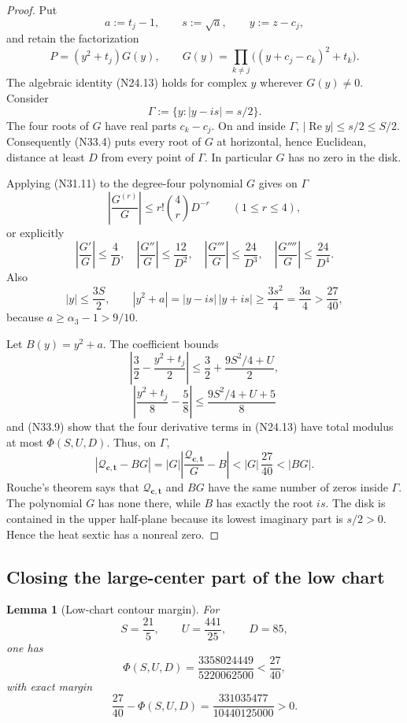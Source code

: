 \documentclass[11pt]{article}
\newtheorem{lemma}[theorem]{Lemma}
\theoremstyle{definition}
\theoremstyle{remark}
\begin{document}
\begin{proof}
Put
\[
 a:=t_j-1,\qquad s:=\sqrt a,\qquad y:=z-c_j,
 \tag{N33.5}
\]
and retain the factorization
\[
 P=(y^2+t_j)G(y),\qquad
 G(y)=\prod_{k\ne j}\bigl((y+c_j-c_k)^2+t_k\bigr).
 \tag{N33.6}
\]
The algebraic identity \textup{(N24.13)} holds for complex \(y\)
wherever \(G(y)\ne0\).  Consider
\[
 \Gamma:=\{y:|y-is|=s/2\}.
 \tag{N33.7}
\]
The four roots of \(G\) have real parts \(c_k-c_j\).  On and inside
\(\Gamma\), \(|\operatorname{Re}y|\leq s/2\leq S/2\).
Consequently \textup{(N33.4)} puts every root of \(G\) at horizontal,
hence Euclidean, distance at least \(D\) from every point of \(\Gamma\).
In particular \(G\) has no zero in the disk.

Applying \textup{(N31.11)} to the degree-four polynomial \(G\) gives
on \(\Gamma\)
\[
 \left|\frac{G^{(r)}}G\right|
 \leq r!\binom4rD^{-r}\qquad(1\leq r\leq4),
 \tag{N33.8}
\]
or explicitly
\[
 \left|\frac{G'}G\right|\leq\frac4D,\quad
 \left|\frac{G''}G\right|\leq\frac{12}{D^2},\quad
 \left|\frac{G'''}G\right|\leq\frac{24}{D^3},\quad
 \left|\frac{G''''}G\right|\leq\frac{24}{D^4}.
 \tag{N33.9}
\]
Also
\[
 |y|\leq\frac{3S}{2},\qquad
 |y^2+a|=|y-is|\,|y+is|
 \geq\frac{3s^2}{4}
 =\frac{3a}{4}>\frac{27}{40},
 \tag{N33.10}
\]
because \(a\geq\alpha_3-1>9/10\).

Let \(B(y)=y^2+a\).  The coefficient bounds
\[
 \left|\frac32-\frac{y^2+t_j}{2}\right|
 \leq\frac32+\frac{9S^2/4+U}{2},
 \tag{N33.11}
\]
\[
 \left|\frac{y^2+t_j}{8}-\frac58\right|
 \leq\frac{9S^2/4+U+5}{8}
 \tag{N33.12}
\]
and \textup{(N33.9)} show that the four derivative terms in
\textup{(N24.13)} have total modulus at most \(\Phi(S,U,D)\).
Thus, on \(\Gamma\),
\[
 |\mathcal Q_{\bm c,\bm t}-BG|
 =|G|\left|\frac{\mathcal Q_{\bm c,\bm t}}G-B\right|
 <|G|\,\frac{27}{40}<|BG|.
 \tag{N33.13}
\]
Rouche's theorem says that \(\mathcal Q_{\bm c,\bm t}\) and \(BG\)
have the same number of zeros inside \(\Gamma\).  The polynomial \(G\)
has none there, while \(B\) has exactly the root \(is\).  The disk is
contained in the upper half-plane because its lowest imaginary part is
\(s/2>0\).  Hence the heat sextic has a nonreal zero.
\end{proof}

\subsection{Closing the large-center part of the low chart}

\begin{lemma}[Low-chart contour margin]
\label{lem:f2v33-low-margin}
For
\[
 S=\frac{21}{5},\qquad U=\frac{441}{25},\qquad D=85,
 \tag{N33.14}
\]
one has
\[
 \Phi(S,U,D)
 =\frac{3358024449}{5220062500}
 <\frac{27}{40},
 \tag{N33.15}
\]
with exact margin
\[
 \frac{27}{40}-\Phi(S,U,D)
 =\frac{331035477}{10440125000}>0.
 \tag{N33.16}
\]
\end{lemma}
\end{document}
